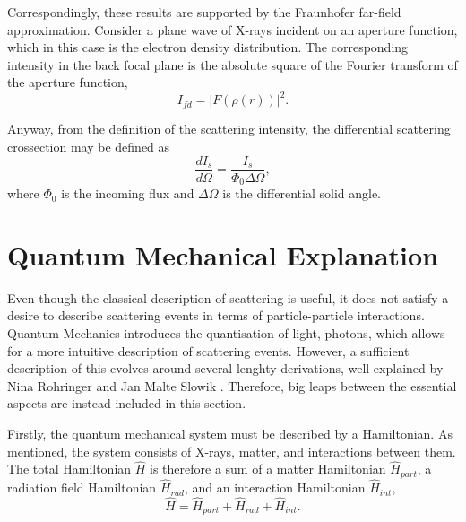 Correspondingly, these results are supported by the Fraunhofer far-field approximation. Consider a plane wave of X-rays incident on an aperture function, which in this case is the electron density distribution.
The corresponding intensity in the back focal plane is the absolute square of the Fourier transform of the aperture function,
\begin{equation}\label{eq:Fraunhofer_intensity}
    I_{fd} = |F\left(\rho(r) \right) |^{2}.
\end{equation}

Anyway, from the definition of the scattering intensity, the differential scattering crossection may be defined as
\begin{equation}\label{eq:scattering_crossection}
    \frac{dI_{s}}{d\Omega} = \frac{I_{s}}{\Phi_{0} \Delta\Omega},
\end{equation}
where $\Phi_{0}$ is the incoming flux and $\Delta\Omega$ is the differential solid angle.



\section{Quantum Mechanical Explanation}\label{sec:quantum_scattering}

Even though the classical description of scattering is useful, it does not satisfy a desire to describe scattering events in terms of particle-particle interactions.
Quantum Mechanics introduces the quantisation of light, photons, which allows for a more intuitive description of scattering events.
However, a sufficient description of this evolves around several lenghty derivations, well explained by Nina Rohringer \cite{rohringer2020introduction} and Jan Malte Slowik \cite{slowik2015quantum}.
Therefore, big leaps between the essential aspects are instead included in this section.

Firstly, the quantum mechanical system must be described by a Hamiltonian. As mentioned, the system consists of X-rays, matter, and interactions between them.
The total Hamiltonian $\hat{H}$ is therefore a sum of a matter Hamiltonian $\hat{H}_{part}$, a radiation field Hamiltonian $\hat{H}_{rad}$, and an interaction Hamiltonian $\hat{H}_{int}$,
\begin{equation}\label{eq:total_Hamiltonian}
    \hat{H} = \hat{H}_{part} + \hat{H}_{rad} + \hat{H}_{int}.
\end{equation}

